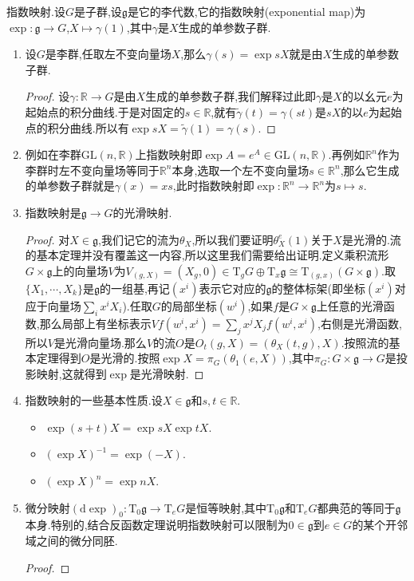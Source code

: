 指数映射.设$G$是子群,设$\mathfrak{g}$是它的李代数,它的指数映射(exponential map)为$\exp:\mathfrak{g}\to G$,$X\mapsto\gamma(1)$,其中$\gamma$是$X$生成的单参数子群.
\begin{enumerate}
	\item 设$G$是李群,任取左不变向量场$X$,那么$\gamma(s)=\exp sX$就是由$X$生成的单参数子群.
	\begin{proof}
		
		设$\gamma:\mathbb{R}\to G$是由$X$生成的单参数子群,我们解释过此即$\gamma$是$X$的以幺元$e$为起始点的积分曲线.于是对固定的$s\in\mathbb{R}$,就有$\widetilde{\gamma}(t)=\gamma(st)$是$sX$的以$e$为起始点的积分曲线.所以有$\exp sX=\widetilde{\gamma}(1)=\gamma(s)$.
	\end{proof}
    \item 例如在李群$\mathrm{GL}(n,\mathbb{R})$上指数映射即$\exp A=e^A\in\mathrm{GL}(n,\mathbb{R})$.再例如$\mathbb{R}^n$作为李群时左不变向量场等同于$\mathbb{R}^n$本身,选取一个左不变向量场$s\in\mathbb{R}^n$,那么它生成的单参数子群就是$\gamma(x)=xs$,此时指数映射即$\exp:\mathbb{R}^n\to\mathbb{R}^n$为$s\mapsto s$.
    \item 指数映射是$\mathfrak{g}\to G$的光滑映射.
    \begin{proof}
    	
    	对$X\in\mathfrak{g}$,我们记它的流为$\theta_X$,所以我们要证明$\theta_X^e(1)$关于$X$是光滑的.流的基本定理并没有覆盖这一内容,所以这里我们需要给出证明.定义乘积流形$G\times\mathfrak{g}$上的向量场$V$为$V_{(g,X)}=(X_g,0)\in\mathrm{T}_gG\oplus\mathrm{T}_x\mathfrak{g}\cong\mathrm{T}_{(g,x)}(G\times\mathfrak{g})$.取$\{X_1,\cdots,X_k\}$是$\mathfrak{g}$的一组基,再记$(x^i)$表示它对应的$\mathfrak{g}$的整体标架(即坐标$(x^i)$对应于向量场$\sum_ix^iX_i$).任取$G$的局部坐标$(w^i)$,如果$f$是$G\times\mathfrak{g}$上任意的光滑函数,那么局部上有坐标表示$Vf(w^i,x^i)=\sum_jx^jX_jf(w^i,x^i)$,右侧是光滑函数,所以$V$是光滑向量场.那么$V$的流$O$是$O_t(g,X)=(\theta_X(t,g),X)$.按照流的基本定理得到$O$是光滑的.按照$\exp X=\pi_G(\theta_1(e,X))$,其中$\pi_G:G\times\mathfrak{g}\to G$是投影映射,这就得到$\exp$是光滑映射.
    \end{proof}
    \item 指数映射的一些基本性质.设$X\in\mathfrak{g}$和$s,t\in\mathbb{R}$.
    \begin{itemize}
        \item $\exp(s+t)X=\exp sX\exp tX$.
        \item $(\exp X)^{-1}=\exp(-X)$.
        \item $(\exp X)^n=\exp nX$.
    \end{itemize}
    \item 微分映射$(\mathrm{d}\exp)_0:\mathrm{T}_0\mathfrak{g}\to\mathrm{T}_eG$是恒等映射,其中$\mathrm{T}_0\mathfrak{g}$和$\mathrm{T}_eG$都典范的等同于$\mathfrak{g}$本身.特别的,结合反函数定理说明指数映射可以限制为$0\in\mathfrak{g}$到$e\in G$的某个开邻域之间的微分同胚.
    \begin{proof}
    	

\end{proof}
\end{enumerate}
